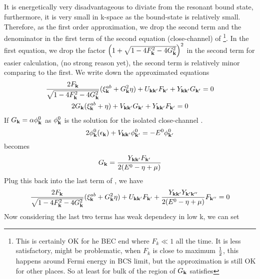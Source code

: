 \subsection{}
It is energetically very disadvantageous to diviate from the resonant bound state, furthermore, it is very small in k-space as the bound-state is relatively small.  Therefore, as the first order approximation, we drop the second term and the denominator in the first term of the second equation (close-channel) of \footnote{ This is certainly OK for he BEC end where $F_{k}\ll1$ all the time.  It is less satisfactory, might be problematic,  when $F_{k}$ is close to maximum $\frac{1}{2}$, this happens around Fermi energy in BCS limit, but the approximation is still OK for other places. So at least for bulk of the region of $G_{\mathbf{k}}$ satisfies }.  In the first equation, we drop the factor $\left(1+\sqrt{1-4 F_{\mathbf{k}}^2-4 G_{\mathbf{k}}^2}\right)^2$ in the second term for easier calculation, (no strong reason yet), the second term is relatively minor comparing to the first. We write down the approximated equations
\begin{subequations}\label{eq:20100915:gap}
\begin{gather}\label{eq:20100915:gapa}
\frac{2F_{\mathbf{k}}}{\sqrt{1-4 F_{\mathbf{k}}^2-4 G_{\mathbf{k}}^2}} (\xi^{ab}_{\mathbf{k}}+  G_{\mathbf{k}}^2\eta)+U_{\mathbf{k}\mathbf{k}'}F_{\mathbf{k}'}+Y_{\mathbf{k}\mathbf{k}'}G_{\mathbf{k}'}=0\\
\label{eq:20100915:gapb}
{2G_{\ensuremath{\mathbf{k}}}}(\xi^{ab}_{\mathbf{k}}+\eta)+V_{\mathbf{k}\mathbf{k}'}G_{\mathbf{k}'}+Y_{\mathbf{k}\mathbf{k}'}F_{\mathbf{k}'}=0
\end{gather}
\end{subequations}
If $G_{\mathbf{k}}=\alpha\phi^{0}_{\mathbf{k}}$ as $\phi_{\mathbf{k}}^{0}$ is the solution for the isolated close-channel \sch.  
\begin{equation}\label{eq:20100915:twobody}
{2\phi^{0}_{\ensuremath{\mathbf{k}}}}(\epsilon_{\mathbf{k}})+V_{\mathbf{k}\mathbf{k}'}\phi^{0}_{\mathbf{k}'}=-E^{0}\phi^{0}_{\mathbf{k}'}
\end{equation}
 becomes
\begin{equation}
G_{\mathbf{k}}=\frac{Y_{\mathbf{k}\mathbf{k}'}F_{\mathbf{k}'}}{2(E^{0}-\eta+\mu)}
\end{equation}
Plug this back into the last term of , we have 
\begin{equation}
\frac{2F_{\mathbf{k}}}{\sqrt{1-4 F_{\mathbf{k}}^2-4 G_{\mathbf{k}}^2}} (\xi^{ab}_{\mathbf{k}}+  G_{\mathbf{k}}^2\eta)+U_{\mathbf{k}\mathbf{k}'}F_{\mathbf{k}'}+\frac{Y_{\mathbf{k}\mathbf{k}'}Y_{\mathbf{k}'\mathbf{k}''}}{2(E^{0}-\eta+\mu)}F_{\mathbf{k}''}=0
\end{equation}
Now considering the last two terms has weak dependecy in low k, we can set 
